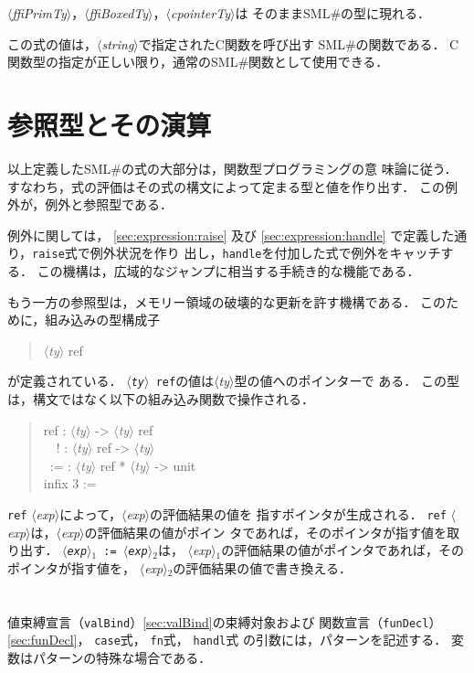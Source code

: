 \documentclass{jbook}
\newcommand{\txt}[2]{#2}
\newcommand{\smlsharp}{SML\#}
\newcommand{\code}[1]{\mbox{\large\tt #1}}
\newcommand{\nonterm}[1]{\mbox{$\langle$}{\it #1}\mbox{$\rangle$}}
\newcommand{\term}[1]{\mbox{{\tt #1}}}
\newenvironment{program}{\begin{quote}\begin{tt}}%
                        {\end{tt}\end{quote}}
\begin{document}
\nonterm{ffiPrimTy}，\nonterm{ffiBoxedTy}，\nonterm{cpointerTy}は
そのまま\smlsharp{}の型に現れる．

	この式の値は，\nonterm{string}で指定されたC関数を呼び出す
\smlsharp{}の関数である．
	C関数型の指定が正しい限り，通常の\smlsharp{}関数として使用できる．

\section{参照型とその演算}
\label{sec:ref}

	以上定義した\smlsharp{}の式の大部分は，関数型プログラミングの意
味論に従う．
	すなわち，式の評価はその式の構文によって定まる型と値を作り出す．
	この例外が，例外と参照型である．

	例外に関しては，
\ref{sec:expression:raise}
及び
\ref{sec:expression:handle}
で定義した通り，\term{raise}式で例外状況を作り
出し，\term{handle}を付加した式で例外をキャッチする．
	この機構は，広域的なジャンプに相当する手続き的な機能である．

	もう一方の参照型は，メモリー領域の破壊的な更新を許す機構である．
	このために，組み込みの型構成子
\begin{program}
\nonterm{ty} ref
\end{program}
が定義されている．
	\code{\nonterm{ty} ref}の値は\nonterm{ty}型の値へのポインターで
ある．
	この型は，構文ではなく以下の組み込み関数で操作される．
\begin{program}
ref : \nonterm{ty} -> \nonterm{ty} ref\\
\ \ ! : \nonterm{ty} ref -> \nonterm{ty}\\
\ :=  : \nonterm{ty} ref * \nonterm{ty}  -> unit\\
infix 3 :=
\end{program}
	\code{ref} \nonterm{exp}によって，\nonterm{exp}の評価結果の値を
指すポインタが生成される．
	\code{ref} \nonterm{exp}は，\nonterm{exp}の評価結果の値がポイン
タであれば，そのポインタが指す値を取り出す．
	\code{\nonterm{exp}$_1$ := \nonterm{exp}$_2$}は，
\nonterm{exp}$_1$の評価結果の値がポインタであれば，そのポインタが指す値を，
\nonterm{exp}$_2$の評価結果の値で書き換える．


\section{\txt{パターンの構文と変数束縛}{}}

	値束縛宣言（\code{valBind}）\ref{sec:valBind}の束縛対象および
関数宣言（\code{funDecl}）\ref{sec:funDecl}，
\code{case}式，
\code{fn}式，
\code{handl}式
の引数には，パターンを記述する．
	変数はパターンの特殊な場合である．
\end{document}
